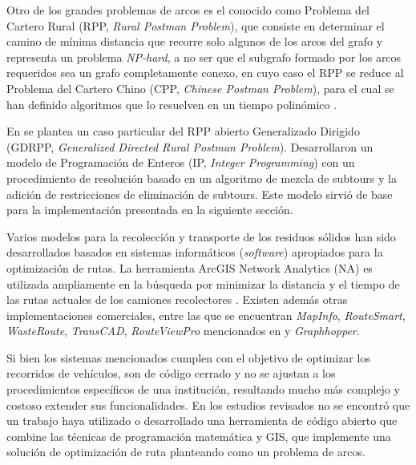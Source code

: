 \documentclass[spanish, conference]{IEEEtran}
\begin{document}
Otro de los grandes problemas de arcos es el conocido como Problema del Cartero Rural (RPP, \textit{Rural Postman Problem}), que consiste en determinar el camino de mínima distancia que recorre solo algunos de los arcos del grafo y representa un problema \textit{NP-hard}, a no ser que el subgrafo formado por los arcos requeridos sea un grafo completamente conexo, en cuyo caso el RPP se reduce al Problema del Cartero Chino (CPP, \textit{Chinese Postman Problem}), para el cual se han definido algoritmos que lo resuelven en un tiempo polinómico \cite{CalvinoM2011CooperacionPanoramica}.

En \cite{Braier2017AnArgentina} se plantea un caso particular del RPP abierto Generalizado Dirigido (GDRPP, \textit{Generalized Directed Rural Postman Problem}). Desarrollaron un modelo de Programación de Enteros (IP, \textit{Integer Programming}) con un procedimiento de resolución basado en un algoritmo de mezcla de subtours y la adición de restricciones de eliminación de subtours. Este modelo sirvió de base para la implementación presentada en la siguiente sección.

Varios modelos para la recolección y transporte de los residuos sólidos han sido desarrollados basados en sistemas informáticos (\textit{software}) apropiados para la optimización de rutas. La herramienta ArcGIS Network Analytics (NA) es utilizada ampliamente en la búsqueda por minimizar la distancia y el tiempo de las rutas actuales de los camiones recolectores \cite{Kallel2016UsingTunisia} \cite{Malakahmad2014SolidMalaysia}. Existen además otras implementaciones comerciales, entre las que se encuentran \textit{MapInfo}, \textit{RouteSmart}, \textit{WasteRoute}, \textit{TransCAD}, \textit{RouteViewPro} mencionados en \cite{Kallel2016UsingTunisia} y \textit{Graphhopper}.

Si bien los sistemas mencionados cumplen con el objetivo de optimizar los recorridos de vehículos, son de código cerrado y no se ajustan a los procedimientos específicos de una institución, resultando mucho más complejo y costoso extender sus funcionalidades. En los estudios revisados no se encontró que un trabajo haya utilizado o desarrollado una herramienta de código abierto que combine las técnicas de programación matemática y GIS, que implemente una solución de optimización de ruta planteando como un problema de arcos. 
\end{document}
